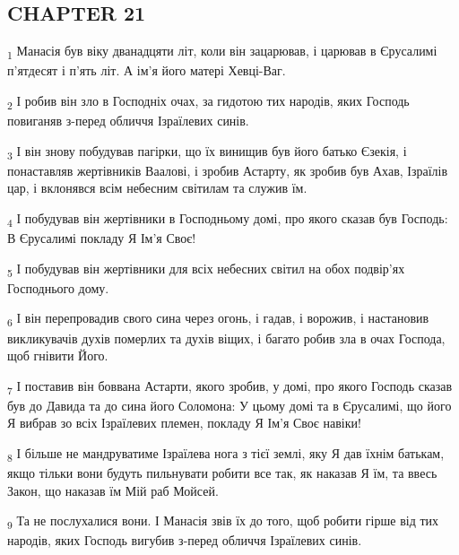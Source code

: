 \subsection{CHAPTER 21}
\begin{tcolorbox}
\textsubscript{1} Манасія був віку дванадцяти літ, коли він зацарював, і царював в Єрусалимі п'ятдесят і п'ять літ. А ім'я його матері Хевці-Ваг.
\end{tcolorbox}
\begin{tcolorbox}
\textsubscript{2} І робив він зло в Господніх очах, за гидотою тих народів, яких Господь повиганяв з-перед обличчя Ізраїлевих синів.
\end{tcolorbox}
\begin{tcolorbox}
\textsubscript{3} І він знову побудував пагірки, що їх винищив був його батько Єзекія, і понаставляв жертівників Ваалові, і зробив Астарту, як зробив був Ахав, Ізраїлів цар, і вклонявся всім небесним світилам та служив їм.
\end{tcolorbox}
\begin{tcolorbox}
\textsubscript{4} І побудував він жертівники в Господньому домі, про якого сказав був Господь: В Єрусалимі покладу Я Ім'я Своє!
\end{tcolorbox}
\begin{tcolorbox}
\textsubscript{5} І побудував він жертівники для всіх небесних світил на обох подвір'ях Господнього дому.
\end{tcolorbox}
\begin{tcolorbox}
\textsubscript{6} І він перепровадив свого сина через огонь, і гадав, і ворожив, і настановив викликувачів духів померлих та духів віщих, і багато робив зла в очах Господа, щоб гнівити Його.
\end{tcolorbox}
\begin{tcolorbox}
\textsubscript{7} І поставив він боввана Астарти, якого зробив, у домі, про якого Господь сказав був до Давида та до сина його Соломона: У цьому домі та в Єрусалимі, що його Я вибрав зо всіх Ізраїлевих племен, покладу Я Ім'я Своє навіки!
\end{tcolorbox}
\begin{tcolorbox}
\textsubscript{8} І більше не мандруватиме Ізраїлева нога з тієї землі, яку Я дав їхнім батькам, якщо тільки вони будуть пильнувати робити все так, як наказав Я їм, та ввесь Закон, що наказав їм Мій раб Мойсей.
\end{tcolorbox}
\begin{tcolorbox}
\textsubscript{9} Та не послухалися вони. І Манасія звів їх до того, щоб робити гірше від тих народів, яких Господь вигубив з-перед обличчя Ізраїлевих синів.
\end{tcolorbox}
